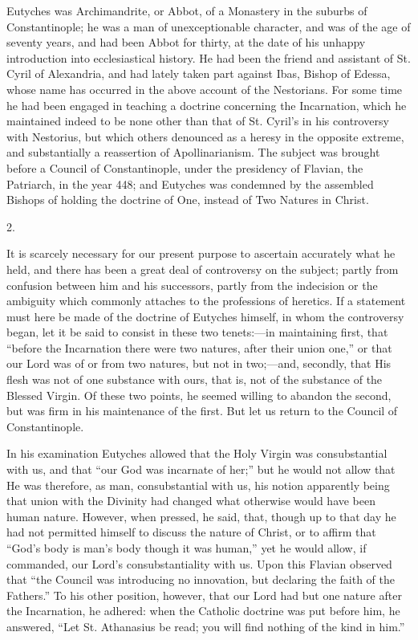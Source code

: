 Eutyches was Archimandrite, or Abbot, of a Monastery in the
suburbs of Constantinople; he was a man of unexceptionable character,
and was of the age of seventy years, and had been Abbot for thirty, at
the date of his unhappy introduction into ecclesiastical history. He
had been the friend and assistant of St. Cyril of Alexandria, and had
lately taken part against Ibas, Bishop of Edessa, whose name has
occurred in the above account of the Nestorians. For some time he had
been engaged in teaching a doctrine concerning the Incarnation, which
he maintained indeed to be none other than that of St. Cyril's in his
controversy with Nestorius, but which others denounced as a heresy in
the opposite extreme, and substantially a reassertion of
Apollinarianism. The subject was brought before a Council of
Constantinople, under the presidency of Flavian, the Patriarch, in the
year 448; and Eutyches was condemned by the assembled Bishops of
holding the doctrine of One, instead of Two Natures in Christ.

2.

It is scarcely necessary for our present purpose to ascertain
accurately what he held, and there has been a great deal of
controversy on the subject; partly from confusion between him and his
successors, partly from the indecision or the ambiguity which commonly
attaches to the professions of heretics. If a statement must here be
made of the doctrine of Eutyches himself, in whom the controversy
began, let it be said to consist in these two tenets:—in maintaining
first, that ``before the Incarnation there were two natures, after
their union one,'' or that our Lord was of or from two natures,
but not in two;—and, secondly, that His flesh was not of one
substance with ours, that is, not of the substance of the Blessed
Virgin. Of these two points, he seemed willing to abandon the second,
but was firm in his maintenance of the first. But let us return to the
Council of Constantinople.

In his examination Eutyches allowed that the Holy Virgin was
consubstantial with us, and that ``our God was incarnate of
her;'' but he would not allow that He was therefore, as man,
consubstantial with us, his notion apparently being that union with
the Divinity had changed what otherwise would have been human nature.
However, when pressed, he said, that, though up to that day he had not
permitted himself to discuss the nature of Christ, or to affirm that
``God's body is man's body though it was human,'' yet he would
allow, if commanded, our Lord's consubstantiality with us. Upon this
Flavian observed that ``the Council was introducing no innovation,
but declaring the faith of the Fathers.'' To his other position,
however, that our Lord had but one nature after the Incarnation, he
adhered: when the Catholic doctrine was put before him, he answered,
``Let St. Athanasius be read; you will find nothing of the kind in
him.''

